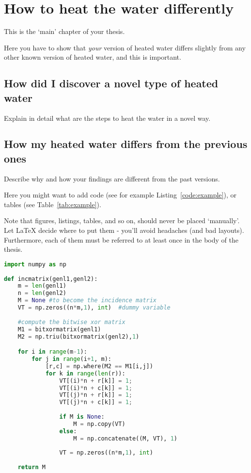 
\chapter{How to heat the water differently}
\label{cap:proposal}

This is the `main' chapter of your thesis.

Here you have to show that \emph{your} version of heated water differs slightly from any other known version of heated water, and this is important.

\section{How did I discover a novel type of heated water}

Explain in detail what are the steps to heat the water in a novel way.

\section{How my heated water differs from the previous ones}

Describe why and how your findings are different from the past versions.

Here you might want to add code (see for example Listing~\ref{code:example}), or tables (see Table~\ref{tab:example}).

Note that figures, listings, tables, and so on, should never be placed `manually'. Let LaTeX decide where to put them - you'll avoid headaches (and bad layouts). Furthermore, each of them must be referred to at least once in the body of the thesis.


\begin{lstlisting}[language=Python, caption=Python example, float, label=code:example]
import numpy as np
    
def incmatrix(genl1,genl2):
    m = len(genl1)
    n = len(genl2)
    M = None #to become the incidence matrix
    VT = np.zeros((n*m,1), int)  #dummy variable
    
    #compute the bitwise xor matrix
    M1 = bitxormatrix(genl1)
    M2 = np.triu(bitxormatrix(genl2),1) 

    for i in range(m-1):
        for j in range(i+1, m):
            [r,c] = np.where(M2 == M1[i,j])
            for k in range(len(r)):
                VT[(i)*n + r[k]] = 1;
                VT[(i)*n + c[k]] = 1;
                VT[(j)*n + r[k]] = 1;
                VT[(j)*n + c[k]] = 1;
                
                if M is None:
                    M = np.copy(VT)
                else:
                    M = np.concatenate((M, VT), 1)
                
                VT = np.zeros((n*m,1), int)
    
    return M
\end{lstlisting}

